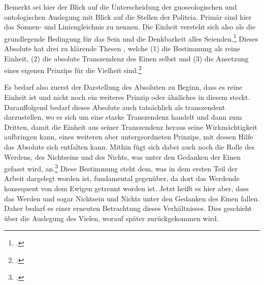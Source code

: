 Bemerkt sei hier der Blick auf die Unterscheidung der gnoseologischen und ontologischen Auslegung mit Blick auf die Stellen der Politeia. Primär sind hier das Sonnen- und Liniengleichnis zu nennen. 
Die Einheit versteht sich also als die grundlegende Bedingung für das Sein und die Denkbarkeit alles Seienden.\footcite[vgl.][S. 97]{halfwassen2015spuren} 
Dieses Absolute hat drei zu klärende Thesen
, welche (1) die Bestimmung als reine Einheit, (2) die absolute Transzendenz des Einen selbst und (3) die Ansetzung eines eigenen Prinzips für die Vielheit sind.\footcite[vgl.][S. 96]{halfwassen2015spuren}


Es bedarf also zuerst der Darstellung des Absoluten zu Beginn, dass es reine Einheit ist und nicht noch ein weiteres Prinzip oder ähnliches in diesem steckt. Darauffolgend bedarf dieses Absolute auch tatsächlich als transzendent darzustellen, wo es sich um eine starke Transzendenz handelt und dann zum Dritten, damit die Einheit aus seiner Transzendenz heraus seine Wirkmächtigkeit aufbringen kann, eines weiteren aber untergeordneten Prinzips, mit dessen Hilfe das Absolute sich entfalten kann.
Mithin fügt sich dabei auch noch die Rolle des Werdens, des Nichtseins und des Nichts, was unter den Gedanken der Einen gefasst wird, an.\footcite[vgl.][S. 97]{halfwassen2015spuren} Diese Bestimmung steht dem, was in dem ersten Teil der Arbeit dargelegt worden ist, fundamental gegenüber, da dort das Werdende konsequent von dem Ewigen getrennt worden ist. Jetzt heißt es hier aber, dass das Werden und sogar Nichtsein und Nichts unter den Gedanken des Einen fallen. Daher bedarf es einer erneuten Betrachtung dieses Verhältnisses. Dies geschieht über die Auslegung des Vielen, worauf später zurückgekommen wird.



